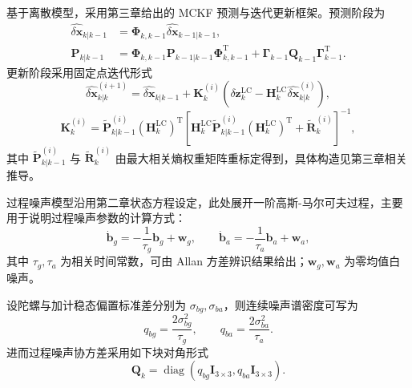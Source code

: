 基于离散模型，采用第三章给出的 MCKF 预测与迭代更新框架。预测阶段为
\begin{align}
	\hat{\delta\bm{x}}_{k|k-1} &= \bm{\Phi}_{k,k-1}\hat{\delta\bm{x}}_{k-1|k-1},\\
	\bm{P}_{k|k-1} &= \bm{\Phi}_{k,k-1}\bm{P}_{k-1|k-1}\bm{\Phi}_{k,k-1}^{\mathrm T}
	+ \bm{\Gamma}_{k-1}\bm{Q}_{k-1}\bm{\Gamma}_{k-1}^{\mathrm T}.
	\label{eq:ch4_predict_cov}
\end{align}
更新阶段采用固定点迭代形式
\begin{equation}
	\hat{\delta\bm{x}}_{k|k}^{(i+1)}=
	\hat{\delta\bm{x}}_{k|k-1}+\bm{K}_k^{(i)}
	\left(\delta\bm{z}_k^{\text{LC}}-\bm{H}^{\text{LC}}_k\hat{\delta\bm{x}}_{k|k}^{(i)}\right),
	\label{eq:ch4_mckf_iter}
\end{equation}
\begin{equation}
	\bm{K}_k^{(i)}=\tilde{\bm{P}}_{k|k-1}^{(i)}\left(\bm{H}^{\text{LC}}_k\right)^{\mathrm T}
	\left[\bm{H}^{\text{LC}}_k\tilde{\bm{P}}_{k|k-1}^{(i)}\left(\bm{H}^{\text{LC}}_k\right)^{\mathrm T}+\tilde{\bm{R}}_k^{(i)}\right]^{-1},
	\label{eq:ch4_mckf_gain}
\end{equation}
其中 $\tilde{\bm{P}}_{k|k-1}^{(i)}$ 与 $\tilde{\bm{R}}_k^{(i)}$ 由最大相关熵权重矩阵重标定得到，具体构造见第三章相关推导。

过程噪声模型沿用第二章状态方程设定，此处展开一阶高斯-马尔可夫过程，主要用于说明过程噪声参数的计算方式\cite{wang2018using}：
\begin{equation}
	\dot{\bm{b}}_g=-\frac{1}{\tau_g}\bm{b}_g+\bm{w}_g,
	\qquad
	\dot{\bm{b}}_a=-\frac{1}{\tau_a}\bm{b}_a+\bm{w}_a,
	\label{eq:ch4_markov_bias}
\end{equation}
其中 $\tau_g,\tau_a$ 为相关时间常数，可由 Allan 方差辨识结果给出；$\bm{w}_g,\bm{w}_a$ 为零均值白噪声。

设陀螺与加计稳态偏置标准差分别为 $\sigma_{bg},\sigma_{ba}$，则连续噪声谱密度可写为
\begin{equation}
	q_{bg}=\frac{2\sigma_{bg}^2}{\tau_g},
	\qquad
	q_{ba}=\frac{2\sigma_{ba}^2}{\tau_a}.
	\label{eq:ch4_psd_from_allan}
\end{equation}
进而过程噪声协方差采用如下块对角形式
\begin{equation}
	\bm{Q}_{k}=
	\operatorname{diag}
	\left(
	q_{bg}\bm{I}_{3\times3},
	q_{ba}\bm{I}_{3\times3}
	\right).
	\label{eq:ch4_Qk_def}
\end{equation}

